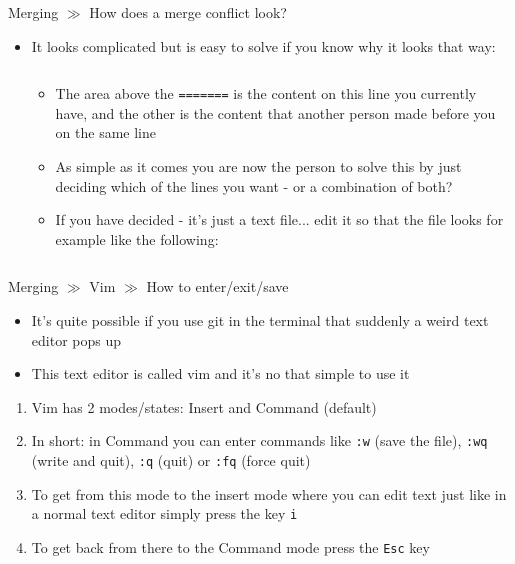 \documentclass[10pt]{beamer}
\begin{document}
\begin{frame}{Merging $\gg$ How does a merge conflict look?}
	\begin{itemize}
		\item It looks complicated but is easy to solve if you know why it looks that way:
		\inputminted[bgcolor=lightGreyCustom,fontsize=\scriptsize]{sh}{./resources/git_merging_04_create_conflict_output.sh}
		\begin{itemize}
			\item The area above the \texttt{=======} is the content on this line you currently have, and the other is the content that another person made before you on the same line
			\item As simple as it comes you are now the person to solve this by just deciding which of the lines you want - or a combination of both?
			\item If you have decided - it's just a text file... edit it so that the file looks for example like the following:
			\inputminted[bgcolor=lightGreyCustom,fontsize=\scriptsize]{sh}{./resources/git_merging_05_create_conflict_solved.sh}
		\end{itemize}
	\end{itemize}
\end{frame}

\begin{frame}{Merging $\gg$ Vim $\gg$ How to enter/exit/save}
	\begin{itemize}
		\item It's quite possible if you use git in the terminal that suddenly a weird text editor pops up
		\item This text editor is called vim and it's no that simple to use it
	\end{itemize}
	\begin{enumerate}
		\item Vim has 2 modes/states: Insert and Command (default)
		\item In short: in Command you can enter commands like \texttt{:w} (save the file), \texttt{:wq} (write and quit), \texttt{:q} (quit) or \texttt{:fq} (force quit)
		\item To get from this mode to the insert mode where you can edit text just like in a normal text editor simply press the key \texttt{i}
		\item To get back from there to the Command mode press the \texttt{Esc} key
	\end{enumerate}
\end{frame}
\end{document}

